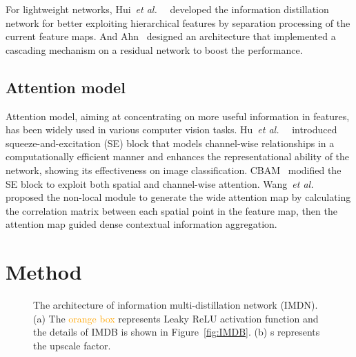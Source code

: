 \documentclass[sigconf]{acmart}
\newcommand{\etal}{\emph{et al.}~}
\begin{document}
For lightweight networks, Hui~\etal~\cite{IDN} developed the information distillation network for better exploiting hierarchical features by separation processing of the current feature maps. And Ahn~\cite{CARN} designed an architecture that implemented a cascading mechanism on a residual network to boost the performance.
\subsection{Attention model}
Attention model, aiming at concentrating on more useful information in features, has been widely used in various computer vision tasks. Hu~\etal~\cite{SENet} introduced squeeze-and-excitation (SE) block that models channel-wise relationships in a computationally efficient manner and enhances the representational ability of the network, showing its effectiveness on image classification. CBAM~\cite{CBAM} modified the SE block to exploit both spatial and channel-wise attention. Wang~\etal~\cite{non-local} proposed the non-local module to generate the wide attention map by calculating the correlation matrix between each spatial point in the feature map, then the attention map guided dense contextual information aggregation.

\section{Method}
\begin{figure*}[htpb]
	\centering
	\hfil
	\vspace{-3mm}
	\caption{The architecture of information multi-distillation network (IMDN). (a) The \textcolor{orange}{orange box} represents Leaky ReLU activation function and the details of IMDB is shown in Figure~\ref{fig:IMDB}. (b) s represents the upscale factor.}
\end{figure*}
\end{document}
